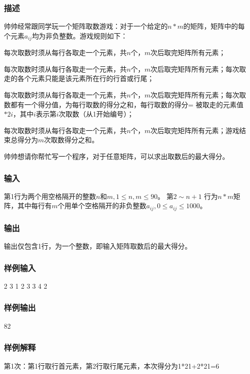 \subsubsection{描述}
帅帅经常跟同学玩一个矩阵取数游戏：对于一个给定的$n*m$的矩阵，矩阵中的每个元素$a_{ij}$均为非负整数。游戏规则如下：
\begindot
\item 每次取数时须从每行各取走一个元素，共$n$个，$m$次后取完矩阵所有元素；
\item 每次取数时须从每行各取走一个元素，共$n$个，$m$次后取完矩阵所有元素；每次取走的各个元素只能是该元素所在行的行首或行尾；
\item 每次取数时须从每行各取走一个元素，共$n$个，$m$次后取完矩阵所有元素；每次取数都有一个得分值，为每行取数的得分之和，每行取数的得分= 被取走的元素值$*2i$，其中$i$表示第$i$次取数（从1开始编号）；
\item 每次取数时须从每行各取走一个元素，共$n$个，$m$次后取完矩阵所有元素；游戏结束总得分为$m$次取数得分之和。
\myenddot

帅帅想请你帮忙写一个程序，对于任意矩阵，可以求出取数后的最大得分。

\subsubsection{输入}
第1行为两个用空格隔开的整数$n$和$m, 1 \leq n,m \leq 90$。
第$2 \sim n+1$ 行为$n*m$矩阵，其中每行有$m$个用单个空格隔开的非负整数$a_{ij}, 0 \leq a_{ij} \leq 1000$。

\subsubsection{输出}
输出仅包含1行，为一个整数，即输入矩阵取数后的最大得分。

\subsubsection{样例输入}
\begin{Code}
2 3
1 2 3
3 4 2
\end{Code}

\subsubsection{样例输出}
\begin{Code}
82
\end{Code}

\subsubsection{样例解释}
第1次：第1行取行首元素，第2行取行尾元素，本次得分为1*21+2*21=6


